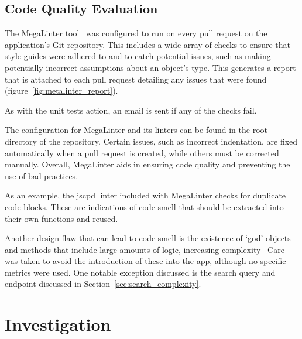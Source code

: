 \subsection{Code Quality Evaluation}
The MegaLinter tool~\cite{vuillamy_megalinter_nodate} was configured to run on every pull request on the application's Git repository. This includes a wide array
of checks to ensure that style guides were adhered to and to catch potential issues, such as making potentially incorrect
assumptions about an object's type. This generates a report that is attached to each pull request detailing
any issues that were found (figure~\ref{fig:metalinter_report}).

As with the unit tests action, an email is sent if any of the checks fail.

The configuration for MegaLinter and its linters can be found in the root directory of the repository.
Certain issues, such as incorrect indentation, are fixed automatically when a pull request is created, while others
must be corrected manually. Overall, MegaLinter aids in ensuring code quality and preventing the use of bad practices.

As an example, the jscpd linter included with MegaLinter checks for duplicate code blocks. These are indications of code
smell that should be extracted into their own functions and reused.~\cite{fowler_refactoring_1997}

Another design flaw that can lead to code smell is the existence of \enquote*{god} objects
and methods that include large amounts of logic, increasing complexity~\cite{marinescu_measurement_2005,vaucher_tracking_2009}
Care was taken to avoid the introduction of these into the \chef{} app, although no specific
metrics were used. One notable exception discussed is the search query and endpoint discussed in
Section~\ref{sec:search_complexity}.

\section{Investigation}

